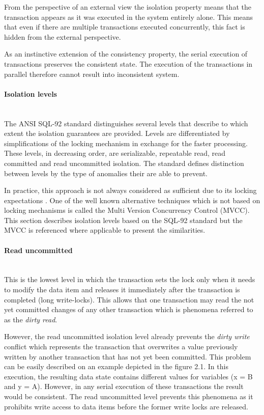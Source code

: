 \documentclass[oneside,
  digital, %
  table,   %
  lof,     %
  lot,     %
]{fithesis3}
\newcommand{\newlinepar}[1]{\paragraph{#1}\needspace{4\baselineskip}\mbox{}\\}
\begin{document}
From the perspective of an external view the isolation property means that the transaction appears as it was executed in the system entirely alone. This means that even if there are multiple transactions executed concurrently, this fact is hidden from the external perspective.

As an instinctive extension of the consistency property, the serial execution of transactions preserves the consistent state. The execution of the transactions in parallel therefore cannot result into inconsistent system.

\newlinepar{Isolation levels}

The ANSI SQL-92 \cite{sql-92} standard distinguishes several levels that describe to which extent the isolation guarantees are provided. Levels are differentiated by simplifications of the locking mechanism in exchange for the faster processing. These levels, in decreasing order, are serializable, repeatable read, read committed and read uncommitted isolation. The standard defines distinction between levels by the type of anomalies their are able to prevent. 

In practice, this approach is not always considered as sufficient due to its locking expectations \cite{ansi-sql-critique}. One of the well known alternative techniques which is not based on locking mechanisms is called the Multi Version Concurrency Control (MVCC). This section describes isolation levels based on the SQL-92 standard but the MVCC is referenced where applicable to present the similarities.

\newlinepar{Read uncommitted}

This is the lowest level in which the transaction sets the lock only when it needs to modify the data item and releases it immediately after the transaction is completed (long write-locks). This allows that one transaction may read the not yet committed changes of any other transaction which is phenomena referred to as the \textit{dirty read}.

However, the read uncommitted isolation level already prevents the \textit{dirty write} conflict which represents the transaction that overwrites a value previously written by another transaction that has not yet been committed. This problem can be easily described on an example depicted in the figure 2.1. In this execution, the resulting data state contains different values for variables (x = B and y = A). However, in any serial execution of these transactions the result would be consistent. The read uncommitted level prevents this phenomena as it prohibits write access to data items before the former write locks are released.
\end{document}
